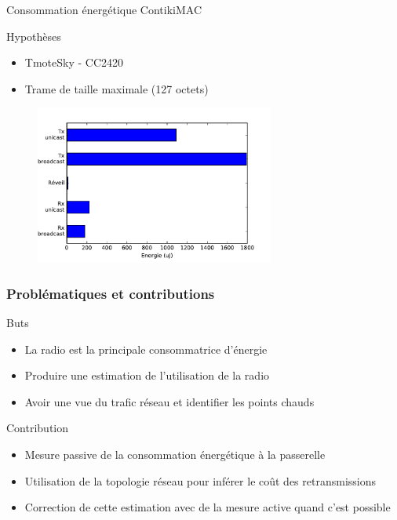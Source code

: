 \begin{frame}{Consommation énergétique ContikiMAC}

  \begin{block}{Hypothèses}
    \begin{itemize}
      \item TmoteSky - CC2420
      \item Trame de taille maximale (127 octets)
    \end{itemize}
  \end{block}

  \begin{figure}
    \centering
    \includegraphics[width=0.7\textwidth]{figures/consommation_contikimac.pdf}
  \end{figure}

\end{frame}

\begin{frame}\frametitle{Problématiques et contributions}

  \begin{block}{Buts}
    \begin{itemize}
      \item La radio est la principale consommatrice d'énergie
      \item Produire une estimation de l'utilisation de la radio
      \item Avoir une vue du trafic réseau et identifier les points chauds
    \end{itemize}
  \end{block}

  \begin{alertblock}{Contribution}
    \begin{itemize}
      \item Mesure passive de la consommation énergétique à la passerelle
      \item Utilisation de la topologie réseau pour inférer le coût des retransmissions
      \item Correction de cette estimation avec de la mesure active quand c'est possible
    \end{itemize}
  \end{alertblock}

\end{frame}

